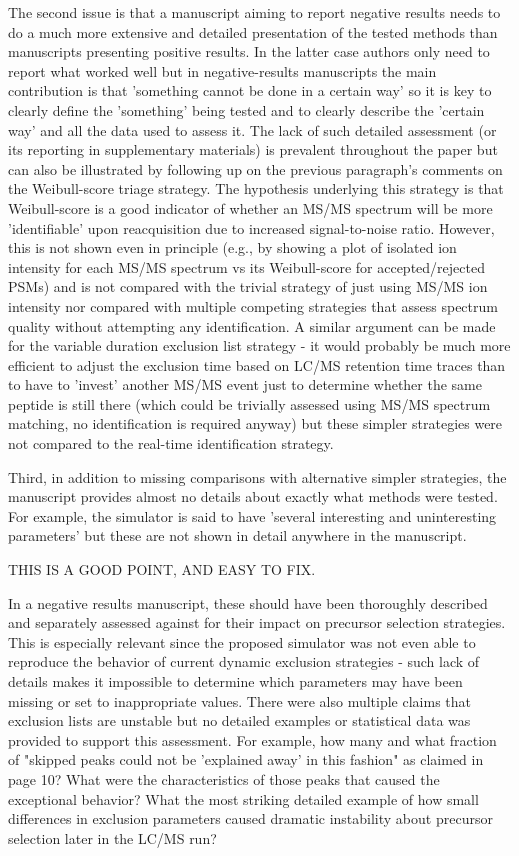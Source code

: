 The second issue is that a manuscript aiming to report negative
results needs to do a much more extensive and detailed presentation
of the tested methods than manuscripts presenting positive results.
In the latter case authors only need to report what worked well but
in negative-results manuscripts the main contribution is that
'something cannot be done in a certain way' so it is key to clearly
define the 'something' being tested and to clearly describe the
'certain way' and all the data used to assess it. The lack of such
detailed assessment (or its reporting in supplementary materials)
is prevalent throughout the paper but can also be illustrated by
following up on the previous paragraph's comments on the
Weibull-score triage strategy. The hypothesis underlying this
strategy is that Weibull-score is a good indicator of whether an
MS/MS spectrum will be more 'identifiable' upon reacquisition due
to increased signal-to-noise ratio. However, this is not shown even
in principle (e.g., by showing a plot of isolated ion intensity for
each MS/MS spectrum vs its Weibull-score for accepted/rejected
PSMs) and is not compared with the trivial strategy of just using
MS/MS ion intensity nor compared with multiple competing strategies
that assess spectrum quality without attempting any identification.
A similar argument can be made for the variable duration exclusion
list strategy - it would probably be much more efficient to adjust
the exclusion time based on LC/MS retention time traces than to
have to 'invest' another MS/MS event just to determine whether the
same peptide is still there (which could be trivially assessed
using MS/MS spectrum matching, no identification is required
anyway) but these simpler strategies were not compared to the
real-time identification strategy.

Third, in addition to missing comparisons with alternative simpler
strategies, the manuscript provides almost no details about exactly
what methods were tested. For example, the simulator is said to
have 'several interesting and uninteresting parameters' but these
are not shown in detail anywhere in the manuscript.

THIS IS A GOOD POINT, AND EASY TO FIX.

In a negative
results manuscript, these should have been thoroughly described and
separately assessed against for their impact on precursor selection
strategies. This is especially relevant since the proposed
simulator was not even able to reproduce the behavior of current
dynamic exclusion strategies - such lack of details makes it
impossible to determine which parameters may have been missing or
set to inappropriate values. There were also multiple claims that
exclusion lists are unstable but no detailed examples or
statistical data was provided to support this assessment. For
example, how many and what fraction of "skipped peaks could not be
'explained away' in this fashion" as claimed in page 10? What were
the characteristics of those peaks that caused the exceptional
behavior? What the most striking detailed example of how small
differences in exclusion parameters caused dramatic instability
about precursor selection later in the LC/MS run?

